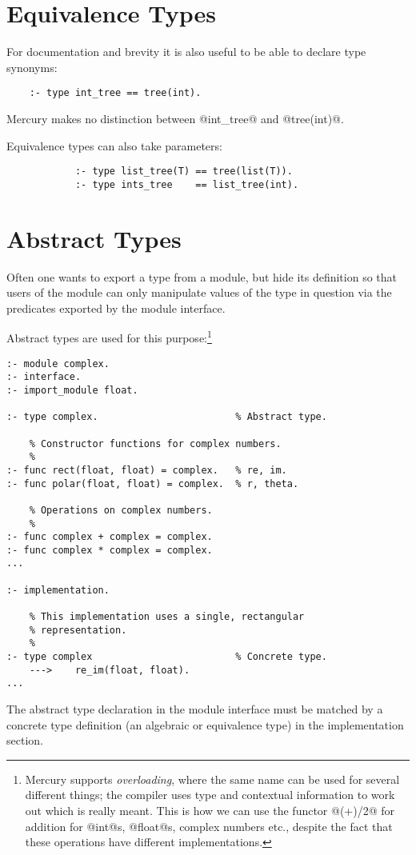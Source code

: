 \section{Equivalence Types}

For documentation and brevity it is also useful to be able to
declare type synonyms:
\begin{verbatim}
    :- type int_tree == tree(int).
\end{verbatim}
Mercury makes no distinction between @int_tree@ and
@tree(int)@.

Equivalence types can also take parameters:
\begin{verbatim}
            :- type list_tree(T) == tree(list(T)).
            :- type ints_tree    == list_tree(int).
\end{verbatim}

\section{Abstract Types}

Often one wants to export a type from a module, but hide its
definition so that users of the module can only manipulate
values of the type in question via the predicates exported by
the module interface.

Abstract types are used for this purpose:\footnote{Mercury supports \emph{overloading}, where the same name can
be used for several different things; the compiler uses type and
contextual information to work out which is really meant.  This is how
we can use the functor @(+)/2@ for addition for @int@s, @float@s,
complex numbers etc., despite the fact that these operations have
different implementations.}
\begin{verbatim}
:- module complex.
:- interface.
:- import_module float.

:- type complex.                        % Abstract type.

    % Constructor functions for complex numbers.
    %
:- func rect(float, float) = complex.   % re, im.
:- func polar(float, float) = complex.  % r, theta.

    % Operations on complex numbers.
    %
:- func complex + complex = complex.
:- func complex * complex = complex.
...

:- implementation.

    % This implementation uses a single, rectangular
    % representation.
    %
:- type complex                         % Concrete type.
    --->    re_im(float, float).
...
\end{verbatim}
The abstract type declaration in the module interface must be
matched by a concrete type definition (an algebraic or
equivalence type) in the implementation section.

